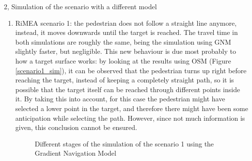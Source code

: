 \documentclass[10pt,a4paper]{article}
\begin{document}
\begin{task}{2, Simulation of the scenario with a different model}
\begin{enumerate}[label=(\alph*)]
    \item RiMEA scenario 1: the pedestrian does not follow a straight line anymore, instead, it moves downwards until the target is reached. The travel time in both simulations are roughly the same, being the simulation using GNM slightly faster, but negligible. This new behaviour is due most probably to how a target surface works: by looking at the results using OSM (Figure \ref{scenario1_sim}), it can be observed that the pedestrian turns up right before reaching the target, instead of keeping a completely straight path, so it is possible that the target itself can be reached through different points inside it. By taking this into account, for this case the pedestrian might have selected a lower point in the target, and therefore there might have been some anticipation while selecting the path. However, since not much information is given, this conclusion cannot be ensured.
    
    \begin{figure} [H]
    \centering
        \caption{Different stages of the simulation of the scenario 1 using the Gradient Navigation Model}
        \label{scenario1_gnm}
    \end{figure}
    

\end{enumerate}
\end{task}
\end{document}
